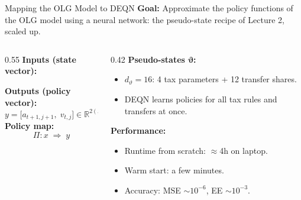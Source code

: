 \documentclass[aspectratio=169,11pt]{beamer}
\newcommand{\keyc}[1]{\textcolor{uzhblue}{#1}}
\begin{document}
\begin{frame}[fragile]{Mapping the OLG Model to DEQN}
\noindent\textbf{Goal:} Approximate the policy functions of the OLG model using a neural network: the pseudo-state recipe of Lecture 2, scaled up.

\vspace{0.2cm}
\begin{columns}
\begin{column}{0.55\textwidth}
\textbf{Inputs (state vector):}
\begin{center}
\end{center}
\textbf{Outputs (policy vector):}
\[
y = \big[a_{t+1,j+1},\; v_{t,j}\big]
\in \mathbb{R}^{2(A-1)}
\]
\textbf{Policy map:}
\[
\Pi: x \;\Rightarrow\; y
\]
\end{column}
\begin{column}{0.42\textwidth}
\textbf{Pseudo-states $\boldsymbol{\vartheta}$:}
\begin{itemize}
  \item $d_\vartheta = 16$: 4 tax parameters + 12 transfer shares.
  \item \keyc{DEQN learns policies for all tax rules and transfers at once}.
\end{itemize}
\vspace{0.3cm}
\textbf{Performance:}
\begin{itemize}
  \item Runtime from scratch: $\approx$4h on laptop.
  \item Warm start: a few minutes.
  \item Accuracy: MSE $\sim 10^{-6}$,\newline
  EE $\sim 10^{-3}$.
\end{itemize}
\end{column}
\end{columns}
\end{frame}
\end{document}
